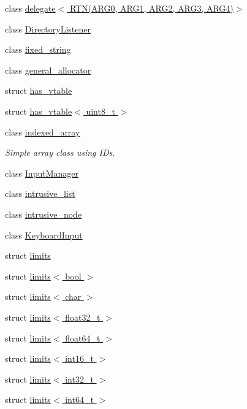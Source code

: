 \begin{DoxyCompactItemize}
\item 
class \hyperlink{classcrap_1_1delegate_3_01_r_t_n_07_a_r_g0_00_01_a_r_g1_00_01_a_r_g2_00_01_a_r_g3_00_01_a_r_g4_08_4}{delegate$<$ R\+T\+N(\+A\+R\+G0, A\+R\+G1, A\+R\+G2, A\+R\+G3, A\+R\+G4)$>$}
\item 
class \hyperlink{classcrap_1_1_directory_listener}{Directory\+Listener}
\item 
class \hyperlink{classcrap_1_1fixed__string}{fixed\+\_\+string}
\item 
class \hyperlink{classcrap_1_1general__allocator}{general\+\_\+allocator}
\item 
struct \hyperlink{structcrap_1_1has__vtable}{has\+\_\+vtable}
\item 
struct \hyperlink{structcrap_1_1has__vtable_3_01uint8__t_01_4}{has\+\_\+vtable$<$ uint8\+\_\+t $>$}
\item 
class \hyperlink{classcrap_1_1indexed__array}{indexed\+\_\+array}
\begin{DoxyCompactList}\small\item\em Simple array class using I\+Ds. \end{DoxyCompactList}\item 
class \hyperlink{classcrap_1_1_input_manager}{Input\+Manager}
\item 
class \hyperlink{classcrap_1_1intrusive__list}{intrusive\+\_\+list}
\item 
class \hyperlink{classcrap_1_1intrusive__node}{intrusive\+\_\+node}
\item 
class \hyperlink{classcrap_1_1_keyboard_input}{Keyboard\+Input}
\item 
struct \hyperlink{structcrap_1_1limits}{limits}
\item 
struct \hyperlink{structcrap_1_1limits_3_01bool_01_4}{limits$<$ bool $>$}
\item 
struct \hyperlink{structcrap_1_1limits_3_01char_01_4}{limits$<$ char $>$}
\item 
struct \hyperlink{structcrap_1_1limits_3_01float32__t_01_4}{limits$<$ float32\+\_\+t $>$}
\item 
struct \hyperlink{structcrap_1_1limits_3_01float64__t_01_4}{limits$<$ float64\+\_\+t $>$}
\item 
struct \hyperlink{structcrap_1_1limits_3_01int16__t_01_4}{limits$<$ int16\+\_\+t $>$}
\item 
struct \hyperlink{structcrap_1_1limits_3_01int32__t_01_4}{limits$<$ int32\+\_\+t $>$}
\item 
struct \hyperlink{structcrap_1_1limits_3_01int64__t_01_4}{limits$<$ int64\+\_\+t $>$}

\end{DoxyCompactItemize}
